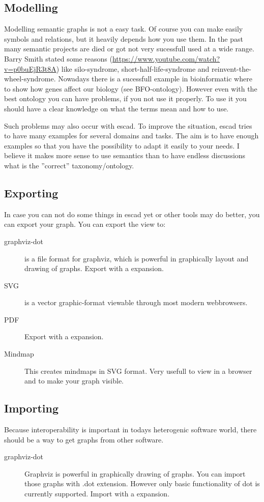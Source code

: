 \documentclass[a4paper, 12pt, openany]{scrbook}
\begin{document}
\subsection{Modelling}
Modelling semantic graphs is not a easy task. Of course you can make easily symbols and relations, but it heavily depends how you use them. In the past many semantic projects are died or got not very sucessfull used at a wide range. Barry Smith stated some reasons (\url{https://www.youtube.com/watch?v=p0buEjR3t8A}) like silo-syndrome, short-half-life-syndrome and reinvent-the-wheel-syndrome. Nowadays there is a sucessfull example in bioinformatic where to show how genes affect our biology (see BFO-ontology). However even with the best ontology you can have problems, if you not use it properly. To use it you should have a clear knowledge on what the terms mean and how to use.

Such problems may also occur with escad. To improve the situation, escad tries to have many examples for several domains and tasks. The aim is to have enough examples so that you have the possibility to adapt it easily to your needs. I believe it makes more sense to use semantics than to have endless discussions what is the ''correct'' taxonomy/ontology.
\subsection{Exporting}
In case you can not do some things in escad yet or other tools may do better, you can export your graph. You can export the view to:
\begin{description}
\item[graphviz-dot] is a file format for graphviz, which is powerful in graphically layout and drawing of graphs. Export with a expansion.
\item[SVG] is a vector graphic-format viewable through most modern webbrowsers.
\item[PDF] Export with a expansion.
\item[Mindmap] This creates mindmaps in SVG format. Very usefull to view in a browser and to make your graph visible.
\end{description}
\subsection{Importing}
Because interoperability is important in todays heterogenic software world, there should be a way to get graphs from other software.
\begin{description}
\item[graphviz-dot] Graphviz is powerful in graphically drawing of graphs. You can import those graphs with .dot extension. However only basic functionality of dot is currently supported. Import with a expansion.
\end{description}
\end{document}
